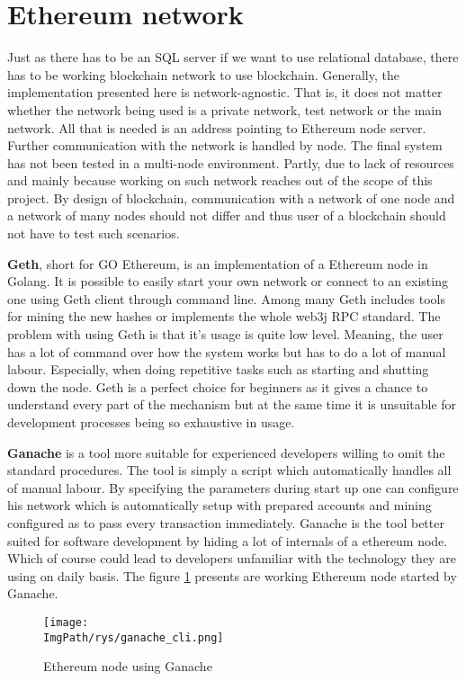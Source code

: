 \documentclass[a4paper,12pt,twoside,openany]{report}
\newcommand{\ImgPath}{.}
\begin{document}
\section{Ethereum network}

Just as there has to be an SQL server if we want to use relational database, there has to be working blockchain network to use blockchain. Generally, the implementation presented here is network-agnostic. That is, it does not matter whether the network being used is a private network, test network or the main network. All that is needed is an address pointing to Ethereum node server. Further communication with the network is handled by node. The final system has not been tested in a multi-node environment. Partly, due to lack of resources and mainly because working on such network reaches out of the scope of this project. By design of blockchain, communication with a network of one node and a network of many nodes should not differ and thus user of a blockchain should not have to test such scenarios.

\textbf{Geth}, short for GO Ethereum, is an implementation of a Ethereum node in Golang. It is possible to easily start your own network or connect to an existing one using Geth client through command line. Among many Geth includes tools for mining the new hashes or implements the whole web3j RPC standard.  The problem with using Geth is that it's usage is quite low level. Meaning, the user has a lot of command over how the system works but has to do a lot of manual labour. Especially, when doing repetitive tasks such as starting and shutting down the node. Geth is a perfect choice for beginners as it gives a chance to understand every part of the mechanism but at the same time it is unsuitable for development processes being so exhaustive in usage.

\textbf{Ganache} is a tool more suitable for experienced developers willing to omit the standard procedures. The tool is simply a script which automatically handles all of manual labour. By specifying the parameters during start up one can configure his network which is automatically setup with prepared accounts and mining configured as to pass every transaction immediately. Ganache is the tool better suited for software development by hiding a lot of internals of a ethereum node. Which of course could lead to developers unfamiliar with the technology they are using on daily basis. The figure \ref{ganache} presents are working Ethereum node started by Ganache.

\begin{figure}[!htbp]
	\begin{center}
\centering
\texttt{[image: \\ImgPath/rys/ganache\_cli.png]}
\end{center}
	\caption{Ethereum node using Ganache}
	\label{ganache}
\end{figure}
\end{document}
